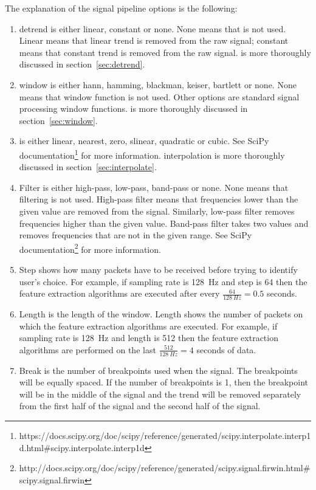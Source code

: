 The explanation of the signal pipeline options is the following:
\begin{enumerate}
	\item \Gls{detrend} is either linear, constant or none. None means that  is not used. Linear means that linear trend is removed from the raw signal; constant means that constant trend is removed from the raw signal.  is more thoroughly discussed in section~\ref{sec:detrend}.
	\item \Gls{window} is either hann, hamming, blackman, keiser, bartlett or none. None means that \gls{window} function is not used. Other options are standard signal processing \gls{window} functions.  is more thoroughly discussed in section~\ref{sec:window}.
	\item {} is either linear, nearest, zero, slinear, quadratic or cubic. See SciPy documentation\footnote{https://docs.scipy.org/doc/scipy/reference/generated/scipy.interpolate.interp1d.html\#scipy.interpolate.interp1d} for more information. \Gls{interpolation} is more thoroughly discussed in section~\ref{sec:interpolate}.
	\item Filter is either high-pass, low-pass, band-pass or none. None means that filtering is not used. High-pass filter means that frequencies lower than the given value are removed from the signal. Similarly, low-pass filter removes frequencies higher than the given value. Band-pass filter takes two values and removes frequencies that are not in the given range. See SciPy documentation\footnote{\label{firwin}http://docs.scipy.org/doc/scipy/reference/generated/scipy.signal.firwin.html\#scipy.signal.firwin} for more information. 
	\item Step shows how many packets have to be received before trying to identify user's choice. For example, if \gls{sampling rate} is \SI{128}{Hz} and step is 64 then the \gls{feature extraction} algorithms are executed after every $\frac{64}{\SI{128}{Hz}}=0.5$ seconds.
	\item Length is the length of the window. Length shows the number of packets on which the \gls{feature extraction} algorithms are executed. For example, if \gls{sampling rate} is \SI{128}{Hz} and length is 512 then the \gls{feature extraction} algorithms are performed on the last $\frac{512}{\SI{128}{Hz}}=4$ seconds of data.
	\item Break is the number of breakpoints used when  the signal. The breakpoints will be equally spaced. If the number of breakpoints is 1, then the breakpoint will be in the middle of the signal and the trend will be removed separately from the first half of the signal and the second half of the signal.

\end{enumerate}
